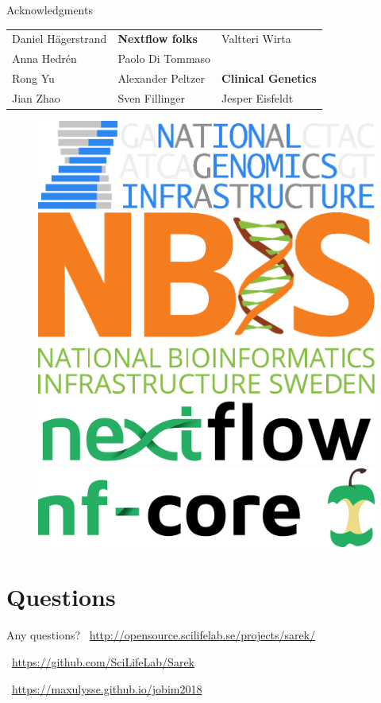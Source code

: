 \documentclass[usepdftitle=false]{beamer}
\begin{document}
\begin{frame}{Acknowledgments}
\begin{table}
{\begin{tabular}{lll}
		Daniel Hägerstrand					&	\textbf{Nextflow folks}			&	Valtteri Wirta						\\
		Anna Hedrén									&	Paolo Di Tommaso						&														\\
		Rong Yu											&	Alexander Peltzer						&	\textbf{Clinical Genetics}\\
		Jian Zhao										&	Sven Fillinger							&	Jesper Eisfeldt						\\
		\end{tabular}}
	\end{table}
	\begin{figure}
		\includegraphics[height=.6cm]{pictures/NGI}%
		\hfill%
		\includegraphics[height=.6cm]{pictures/NBIS}%
		\hfill%
		\includegraphics[height=.6cm]{pictures/nextflow.png}%
		\hfill%
		\includegraphics[height=.6cm]{pictures/nf-core}%
	\end{figure}
\end{frame}

{
	\section{Questions}
	\begin{frame}[plain]{Any questions?}
	\vspace{-6cm}
	\faGlobe\ \url{http://opensource.scilifelab.se/projects/sarek/}

	\faGithub\ \url{https://github.com/SciLifeLab/Sarek}

	\faGlobe\ \url{https://maxulysse.github.io/jobim2018}
	\end{frame}
}
\end{document}
